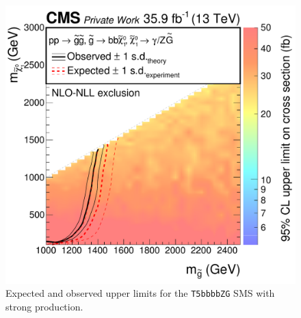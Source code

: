 \begin{figure}[tbp]
 \centering
 \includegraphics[width=\pairwidth]{figures/UnblindingPlots/T5bbbbZg_limits_XSEC2}
 \caption{Expected and observed upper limits for the \texttt{T5bbbbZG} SMS with strong production.}
 \label{fig:limitStrong}
\end{figure}
